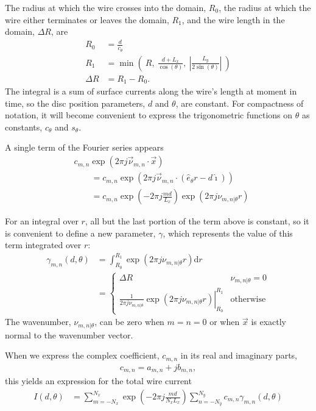 \documentclass{article}
\def\d{\mathrm{d}}
\def\x{\vec{x}}
\def\vnu{\vec{\nu}_{m,n}}
\def\nuth{\nu_{m,n|\theta}}
\def\ui{\hat{\imath}}
\begin{document}
The radius at which the wire crosses into the domain, $R_0$, the radius at which the wire either terminates or leaves the domain, $R_1$, and the wire length in the domain, $\Delta R$, are
\begin{align}
R_0 &= \frac{d}{c_\theta}\\
R_1 &= \min\left(\ R,\ \frac{d + L_x}{\cos(\theta)},\ \left|\frac{L_y}{2\sin(\theta)}\right|\ \right)\\
\Delta R &= R_1 - R_0.
\end{align}
The integral is a sum of surface currents along the wire's length at moment in time, so the disc position parameters, $d$ and $\theta$, are constant.  For compactness of notation, it will become convenient to express the trigonometric functions on $\theta$ as constants, $c_\theta$ and $s_\theta$.

A single term of the Fourier series appears
\begin{align*}
&c_{m,n} \exp\left(2\pi j \vnu \cdot \x \right)\\
&\hspace{2em}= c_{m,n} \exp\left(2\pi j \vnu \cdot (\hat{e}_\theta r - d \ui) \right)\\
&\hspace{2em}= c_{m,n} \exp\left(-2\pi j \frac{md}{L_x} \right) \exp\left(2\pi j \nuth r \right)
\end{align*}


For an integral over $r$, all but the last portion of the term above is constant, so it is convenient to define a new parameter, $\gamma$, which represents the value of this term integrated over $r$:
\begin{align}
\gamma_{m,n}(d,\theta) &= \int_{R_0}^{R_1} \exp\left(2\pi j \nuth r \right) \d r \nonumber\\
 &= \left\{\begin{array}{c|l}
 \Delta R & \nuth = 0\\
 \left.\frac{1}{2\pi j \nuth}\exp\left(2\pi j \nuth r \right)\right|^{R_1}_{R_0} & \mathrm{otherwise}
\end{array}
\right.
\end{align}
The wavenumber, $\nuth$, can be zero when $m=n=0$ or when $\x$ is exactly normal to the wavenumber vector.

When we express the complex coefficient, $c_{m,n}$ in its real and imaginary parts,
\begin{align}
c_{m,n} = a_{m,n} + j b_{m,n},
\end{align}
this yields an expression for the total wire current
\begin{align}
I(d,\theta) &= \sum_{m=-N_x}^{N_x} \exp\left(-2\pi j \frac{md}{N_x L_x} \right) \sum_{n=-N_y}^{N_y} c_{m,n} \gamma_{m,n}(d,\theta)
\end{align}
\end{document}
